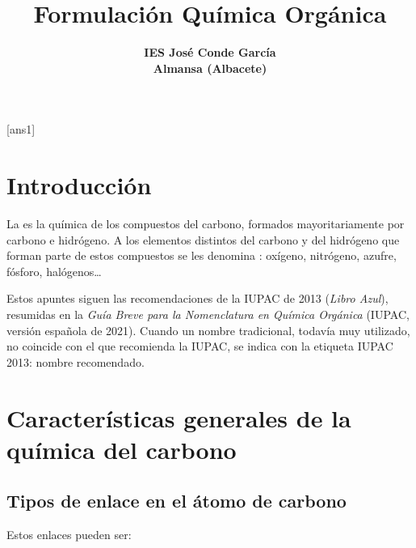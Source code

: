 \documentclass[12pt]{article}
\title{\huge \bfseries \sffamily Formulación Química Orgánica}
\author{\Large \bfseries \sffamily IES José Conde García\\\bfseries \sffamily Almansa (Albacete)}
\date{}
\theoremstyle{mygreennumbox}
\newcommand{\recomendado}[1]{\textcolor{myBlue}{\footnotesize\sffamily IUPAC 2013:} #1}
\begin{document}
\maketitle
\tableofcontents


\newpage{}

\hypersetup{pageanchor=false}
\myemptypage{}
\hypersetup{pageanchor=true}

\newpage{}

[ans1]

\section{Introducción}

La   es la química de los compuestos del carbono, formados mayoritariamente por carbono e hidrógeno. A los elementos distintos del carbono y del hidrógeno que forman parte de estos compuestos se les denomina : oxígeno, nitrógeno, azufre, fósforo, halógenos\dots

Estos apuntes siguen las recomendaciones de la IUPAC de 2013 (\textit{Libro Azul}), resumidas en la \textit{Guía Breve para la Nomenclatura en Química Orgánica} (IUPAC, versión española de 2021). Cuando un nombre tradicional, todavía muy utilizado, no coincide con el que recomienda la IUPAC, se indica con la etiqueta \recomendado{nombre recomendado}.

\section{Características generales de la química del carbono}

\subsection{Tipos de enlace en el átomo de carbono}


Estos enlaces pueden ser:
\end{document}
